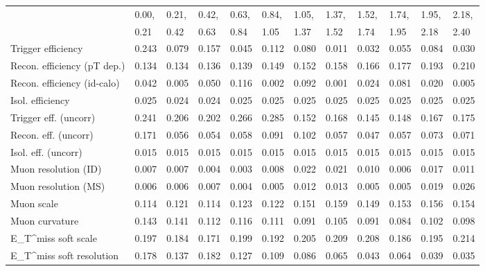 \begin{tabular}{l|p{0.6cm}p{0.6cm}p{0.6cm}p{0.6cm}p{0.6cm}p{0.6cm}p{0.6cm}p{0.6cm}p{0.6cm}p{0.6cm}p{0.6cm}}
\hline
   & 0.00, & 0.21, & 0.42, & 0.63, & 0.84, & 1.05, & 1.37, & 1.52, & 1.74, & 1.95, & 2.18,  \\ 
   & 0.21 & 0.42 & 0.63 & 0.84 & 1.05 & 1.37 & 1.52 & 1.74 & 1.95 & 2.18 & 2.40  \\ 
\hline
Trigger efficiency                       & 0.243 & 0.079 & 0.157 & 0.045 & 0.112 & 0.080 & 0.011 & 0.032 & 0.055 & 0.084 & 0.030 \\
Recon. efficiency (pT dep.)              & 0.134 & 0.134 & 0.136 & 0.139 & 0.149 & 0.152 & 0.158 & 0.166 & 0.177 & 0.193 & 0.210 \\
Recon. efficiency (id-calo)              & 0.042 & 0.005 & 0.050 & 0.116 & 0.002 & 0.092 & 0.001 & 0.024 & 0.081 & 0.020 & 0.005 \\
Isol. efficiency                         & 0.025 & 0.024 & 0.024 & 0.025 & 0.025 & 0.025 & 0.025 & 0.025 & 0.025 & 0.025 & 0.025 \\
Trigger eff. (uncorr)                    & 0.241 & 0.206 & 0.202 & 0.266 & 0.285 & 0.152 & 0.168 & 0.145 & 0.148 & 0.167 & 0.175 \\
Recon. eff. (uncorr)                     & 0.171 & 0.056 & 0.054 & 0.058 & 0.091 & 0.102 & 0.057 & 0.047 & 0.057 & 0.073 & 0.071 \\
Isol. eff. (uncorr)                      & 0.015 & 0.015 & 0.015 & 0.015 & 0.015 & 0.015 & 0.015 & 0.015 & 0.015 & 0.015 & 0.015 \\
Muon resolution (ID)                     & 0.007 & 0.007 & 0.004 & 0.003 & 0.008 & 0.022 & 0.021 & 0.010 & 0.006 & 0.017 & 0.011 \\
Muon resolution (MS)                     & 0.006 & 0.006 & 0.007 & 0.004 & 0.005 & 0.012 & 0.013 & 0.005 & 0.005 & 0.019 & 0.026 \\
Muon scale                               & 0.114 & 0.121 & 0.114 & 0.123 & 0.122 & 0.151 & 0.159 & 0.149 & 0.153 & 0.156 & 0.154 \\
Muon curvature                           & 0.143 & 0.141 & 0.112 & 0.116 & 0.111 & 0.091 & 0.105 & 0.091 & 0.084 & 0.102 & 0.098 \\
E_{T}^{miss} soft scale                  & 0.197 & 0.184 & 0.171 & 0.199 & 0.192 & 0.205 & 0.209 & 0.208 & 0.186 & 0.195 & 0.214 \\
E_{T}^{miss} soft resolution             & 0.178 & 0.137 & 0.182 & 0.127 & 0.109 & 0.086 & 0.065 & 0.043 & 0.064 & 0.039 & 0.035 \\

\end{tabular}
